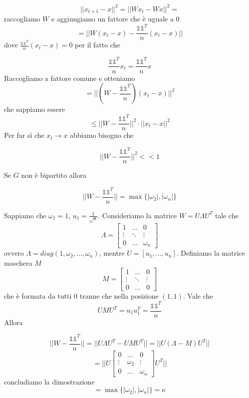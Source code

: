 \documentclass[12pt]{report}
\begin{document}
$$||x_{t+1} - x||^2 = ||W x_t - W x||^2 =$$
raccogliamo $W$ e aggiungiamo un fattore che è uguale a $0$
$$=  ||W(x_t - x) - \frac{\mathds{1} \mathds{1}^T}{n} (x_t-x)||$$
dove $\frac{\mathds{1} \mathds{1}^T}{n} (x_t-x)= 0$ per il fatto che

$$\frac{\mathds{1} \mathds{1}^T}{n} x_t = \frac{\mathds{1} \mathds{1}^T}{n} x$$
Raccogliamo a fattore comune e otteniamo
$$= || (W - \frac{\mathds{1} \mathds{1}^T}{n}) (x_t - x)||^2$$
che sappiamo essere
$$\leq || W - \frac{\mathds{1} \mathds{1}^T}{n}||^2 \cdot ||x_t - x ||^2$$
Per far sì che $x_t \rightarrow x$ abbiamo bisogno che

$$|| W - \frac{\mathds{1} \mathds{1}^T}{n}||^2 << 1$$

\begin{fatto}
    Se $G$ non è bipartito allora

    $$|| W - \frac{\mathds{1}\mathds{1}^T}{n} || = \max\{|\omega_2|, |\omega_n|\}$$
\end{fatto}

\begin{dimo}
    Sappiamo che $\omega_1 = 1$, $u_1 = \frac{\mathds{1}}{\sqrt{n}}$. Consideriamo la matrice $W = U \Lambda U^T$  tale che 
    \[
        \Lambda = \begin{bmatrix}
            1 &   \dots & 0 \\
            \vdots & \ddots & \vdots \\ 
            0 & \dots & \omega_n 
        \end{bmatrix}
    \]
    ovvero $\Lambda = diag(1,\omega_2,\dots,\omega_n)$, mentre $U = [u_1,\dots,u_n]$. Definiamo la matrice maschera $M$
    \[
        M = \begin{bmatrix}
             1 &   \dots & 0 \\
            \vdots & \ddots & \vdots \\ 
            0 & \dots & 0 
        \end{bmatrix}
    \]
    che è formata da tutti $0$ tranne che nella posizione $(1,1)$. Vale che
    $$U M U^T = u_1 u_1^T = \frac{\mathds{1} \mathds{1}^T}{n}$$
    Allora

    $$||W - \frac{\mathds{1} \mathds{1}^T}{n}|| = ||U \Lambda U^T - UMU^T||= ||U (\Lambda - M) U^T ||$$
    \[= ||U \begin{bmatrix}
        0 & \dots & 0 \\ 
        \vdots & \omega_2 & \vdots \\
        0 & \dots &\omega_n
    \end{bmatrix}
    U^T||
    \] 
    concludiamo la dimostrazione
    $$= \max\{|\omega_2|, |\omega_n|\} = \kappa $$
\end{dimo}
\end{document}

